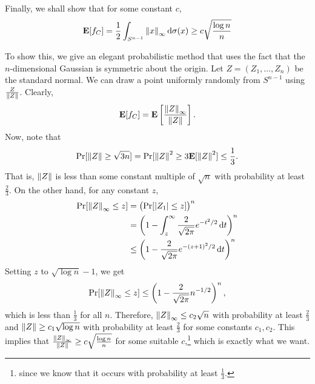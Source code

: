 Finally, we shall show that for some constant $c$,
\[ \textbf{E}[f_C] = \frac{1}{2} \int_{S^{n-1}} \left\lVert x\right\rVert_\infty \operatorname{d}\!{\sigma}(x) \geq c\sqrt\frac{\log n}{n} \]

To show this, we give an elegant probabilistic method that uses the fact that the $n$-dimensional Gaussian is symmetric about the origin. Let $Z=(Z_1,\ldots,Z_n)$ be the standard normal. We can draw a point uniformly randomly from $S^{n-1}$ using $\frac{Z}{\left\lVert Z\right\rVert}$. Clearly,
\[ \textbf{E}[f_C] = \textbf{E}\left[\frac{\left\lVert Z\right\rVert_\infty}{\left\lVert Z\right\rVert}\right]. \]
Now, note that
\[ \Pr[\left\lVert Z\right\rVert \geq \sqrt{3n}] = \Pr[\left\lVert Z\right\rVert^2 \geq 3\textbf{E}[\left\lVert Z\right\rVert^2] \leq \frac{1}{3}. \]
That is, $\left\lVert Z\right\rVert$ is less than some constant multiple of $\sqrt{n}$ with probability at least $\frac{2}{3}$. On the other hand, for any constant $z$,
\begin{align*}
    \Pr[\left\lVert Z\right\rVert_\infty \leq z] &= \left(\Pr[|Z_1| \leq z]\right)^n \\
    &= \left(1 - \int_z^\infty \frac{2}{\sqrt{2\pi}}e^{-t^2/2}\operatorname{d}\!{t} \right)^n \\
    &\leq \left(1 - \frac{2}{\sqrt{2\pi}} e^{-(z+1)^2/2}\operatorname{d}\!{t} \right)^n \\
\end{align*}
Setting $z$ to $\sqrt{\log n}-1$, we get
\[ \Pr[\left\lVert Z\right\rVert_\infty \leq z] \leq \left(1-\frac{2}{\sqrt{2\pi}} n^{-1/2} \right)^n,\]
which is less than $\frac{1}{3}$ for all $n$. Therefore, $\left\lVert Z\right\rVert_\infty \leq c_2\sqrt{n}$ with probability at least $\frac{2}{3}$ and $\left\lVert Z\right\rVert \geq c_1 \sqrt{\log n}$ with probability at least $\frac{2}{3}$ for some constants $c_1,c_2$. This implies that $\frac{\left\lVert Z\right\rVert_\infty}{\left\lVert Z\right\rVert} \geq c\sqrt\frac{\log n}{n}$ for some suitable $c$,\footnote{since we know that it occurs with probability at least $\frac{1}{3}$.} which is exactly what we want.\\